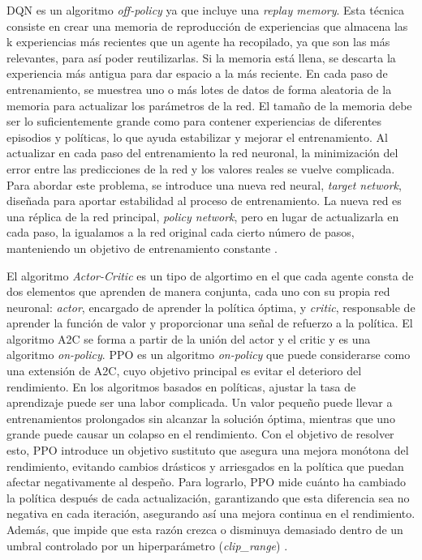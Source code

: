 \ac{DQN} es un algoritmo \textit{off-policy} ya que incluye una \textit{replay memory}. Esta técnica consiste en crear una memoria de reproducción de experiencias que almacena las k experiencias más recientes que un agente ha recopilado, ya que son las más relevantes, para así poder reutilizarlas. Si la memoria está llena, se descarta la experiencia más antigua para dar espacio a la más reciente. En cada paso de entrenamiento, se muestrea uno o más lotes de datos de forma aleatoria de la memoria para actualizar los parámetros de la red. El tamaño de la memoria debe ser lo suficientemente grande como para contener experiencias de diferentes episodios y políticas, lo que ayuda estabilizar y mejorar el entrenamiento. Al actualizar en cada paso del entrenamiento la red neuronal, la minimización del error entre las predicciones de la red y los valores reales se vuelve complicada. Para abordar este problema, se introduce una nueva red neural, \textit{target network}, diseñada para aportar estabilidad al proceso de entrenamiento. La nueva red es una réplica de la red principal, \textit{policy network}, pero en lugar de actualizarla en cada paso, la igualamos a la red original cada cierto número de pasos, manteniendo un objetivo de entrenamiento constante \cite{drl}.

El algoritmo \textit{Actor-Critic} es un tipo de algortimo en el que cada agente consta de dos elementos que aprenden de manera conjunta, cada uno con su propia red neuronal: \textit{actor}, encargado de aprender la política óptima, y \textit{critic}, responsable de aprender la función de valor y proporcionar una señal de refuerzo a la política. El algoritmo \ac{A2C} se forma a partir de la unión del actor y el critic y es una algoritmo \textit{on-policy}. \ac{PPO} es un algoritmo \textit{on-policy} que puede considerarse como una extensión de \ac{A2C}, cuyo objetivo principal es evitar el deterioro del rendimiento. En los algoritmos basados en políticas, ajustar la tasa de aprendizaje puede ser una labor complicada. Un valor pequeño puede llevar a entrenamientos prolongados sin alcanzar la solución óptima, mientras que uno grande puede causar un colapso en el rendimiento. Con el objetivo de resolver esto, \ac{PPO} introduce un objetivo sustituto que asegura una mejora monótona del rendimiento, evitando cambios drásticos y arriesgados en la política que puedan afectar negativamente al despeño. Para lograrlo, \ac{PPO} mide cuánto ha cambiado la política después de cada actualización, garantizando que esta diferencia sea no negativa en cada iteración, asegurando así una mejora continua en el rendimiento. Además, que impide que esta razón crezca o disminuya demasiado dentro de un umbral controlado por un hiperparámetro (\textit{clip\_range}) \cite{drl}. 

